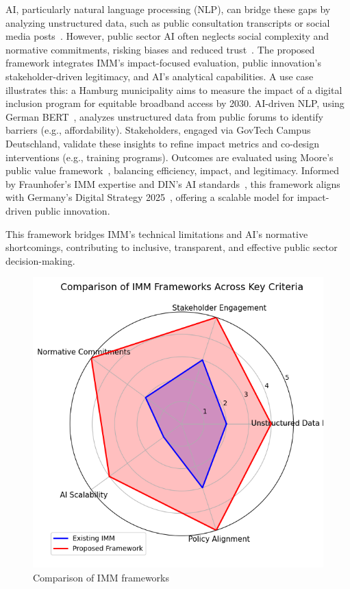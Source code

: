 AI, particularly natural language processing (NLP), can bridge these gaps by analyzing unstructured data, such as public consultation transcripts or social media posts~\cite{oecd_2023}.
However, public sector AI often neglects social complexity and normative commitments, risking biases and reduced trust~\cite{eu_2024}.
The proposed framework integrates IMM’s impact-focused evaluation, public innovation’s stakeholder-driven legitimacy, and AI’s analytical capabilities.
A use case illustrates this: a Hamburg municipality aims to measure the impact of a digital inclusion program for equitable broadband access by 2030.
AI-driven NLP, using German BERT~\cite{huggingface_2023}, analyzes unstructured data from public forums to identify barriers (e.g., affordability).
Stakeholders, engaged via GovTech Campus Deutschland, validate these insights to refine impact metrics and co-design interventions (e.g., training programs).
Outcomes are evaluated using Moore’s public value framework~\cite{moore_1995}, balancing efficiency, impact, and legitimacy.
Informed by Fraunhofer’s IMM expertise and DIN’s AI standards~\cite{din_2023}, this framework aligns with Germany’s Digital Strategy 2025~\cite{bmwi_2022}, offering a scalable model for impact-driven public innovation.

This framework bridges IMM’s technical limitations and AI’s normative shortcomings, contributing to inclusive, transparent, and effective public sector decision-making.

\begin{figure}[H]
    \centering
    \includegraphics[width=0.8\linewidth]{../fig/imm_comparison}
    \caption{Comparison of IMM frameworks}
    \label{fig:comparison_imm_fw}
\end{figure}

